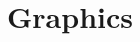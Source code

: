 \documentclass[aspectratio=169,utf8]{beamer}
\begin{document}
%
%
%
%
%
%
%


\section{Graphics}
\end{document}
